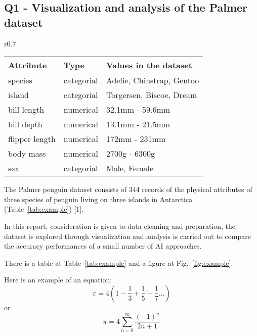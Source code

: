 \documentclass[12pt]{article}
\begin{document}
\subsection*{Q1 - Visualization and analysis of the Palmer dataset}

\begin{wraptable}{r}{0.7\textwidth} %
  \small
  \begin{center}
  \vspace{-2\baselineskip} %
  \setlength{\abovecaptionskip}{5pt}
  \setlength{\belowcaptionskip}{5pt}
  \begin{tabular}{l|l|l}
  Attribute&Type&Values in the dataset\\
  \hline
  species&categorial&Adelie, Chinstrap, Gentoo\\
  island&categorial&Torgersen, Biscoe, Dream\\
  bill length&numerical&32.1mm - 59.6mm\\
  bill depth&numerical&13.1mm - 21.5mm\\
  flipper length&numerical&172mm - 231mm\\
  body mass&numerical&2700g - 6300g\\
  sex&categorial&Male, Female
  \end{tabular}
  \vspace{-1.5\baselineskip} %
  \end{center} 
  \caption{Attributes of the Palmer penguin dataset}
  \vspace{-1\baselineskip} %
  \label{tab:example}
\end{wraptable} 

The Palmer penguin dataset consists of 344 records of the physical attributes of three species of penguin living on three islands in Antarctica (Table~\ref{tab:example}) [1]. 

In this report, consideration is given to data cleaning and preparation, the dataset is explored through visualization and analysis is carried out to compare the accuracy performances of a small number of AI approaches. 

There is a table at Table~\ref{tab:example} and a figure at Fig.~\ref{fig:example}.




Here is an example of an equation:
\begin{equation}
  \pi=4\left(1-\frac{1}{3}+\frac{1}{5}-\frac{1}{7}\ldots\right)
\end{equation}
or
\begin{equation}
  \pi=4\sum_{n=0}^\infty\frac{(-1)^{n}}{2n+1}
\end{equation}
\end{document}
